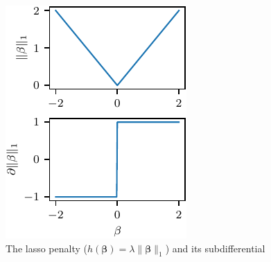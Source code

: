\documentclass[10pt]{beamer}
\begin{document}
\begin{frame}[c]
\begin{columns}
\begin{column}{0.39\textwidth}
      \begin{figure}[htpb]
        \centering
        \includegraphics[width=\textwidth]{figures/paper1-subgradient-split.pdf}
        \caption{%
          The lasso penalty (\(h(\bm{\beta}) =\lambda \lVert \bm{\beta}\rVert_1\)) and its subdifferential
        }
      \end{figure}
    \end{column}
  \end{columns}

\end{frame}
\end{document}
